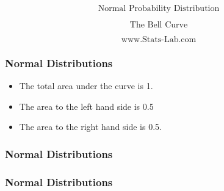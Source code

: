 \documentclass{beamer}
\begin{document}
\begin{frame}


\Large
\[ \mbox{Normal Probability Distribution}  \]

\Large
\[ \mbox{The Bell Curve}  \]

\[ \mbox{www.Stats-Lab.com}\]


\end{frame}
\begin{frame}
\frametitle{Normal Distributions}

\begin{itemize}
\item The total area under the curve is 1.
\item The area to the left hand side is 0.5
\item The area to the right hand side is 0.5.
\end{itemize}

\end{frame}
\begin{frame}
\frametitle{Normal Distributions}


\end{frame}
\begin{frame}
\frametitle{Normal Distributions}


\end{frame}
\end{document}
